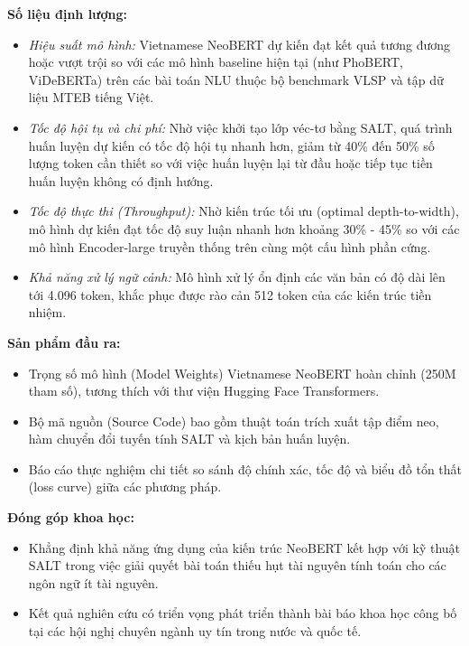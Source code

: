 \documentclass{article}[14pt]
\begin{document}
{    \textbf{Số liệu định lượng:}
    \begin{itemize}
        \item \textit{Hiệu suất mô hình:} Vietnamese NeoBERT dự kiến đạt kết quả tương đương hoặc vượt trội so với các mô hình baseline hiện tại (như PhoBERT, ViDeBERTa) trên các bài toán NLU thuộc bộ benchmark VLSP và tập dữ liệu MTEB tiếng Việt.
        \item \textit{Tốc độ hội tụ và chi phí:} Nhờ việc khởi tạo lớp véc-tơ bằng SALT, quá trình huấn luyện dự kiến có tốc độ hội tụ nhanh hơn, giảm từ 40\% đến 50\% số lượng token cần thiết so với việc huấn luyện lại từ đầu hoặc tiếp tục tiền huấn luyện không có định hướng.
        \item \textit{Tốc độ thực thi (Throughput):} Nhờ kiến trúc tối ưu (optimal depth-to-width), mô hình dự kiến đạt tốc độ suy luận nhanh hơn khoảng 30\% - 45\% so với các mô hình Encoder-large truyền thống trên cùng một cấu hình phần cứng.
        \item \textit{Khả năng xử lý ngữ cảnh:} Mô hình xử lý ổn định các văn bản có độ dài lên tới 4.096 token, khắc phục được rào cản 512 token của các kiến trúc tiền nhiệm.
    \end{itemize}
    
    \textbf{Sản phẩm đầu ra:}
    \begin{itemize}
        \item Trọng số mô hình (Model Weights) Vietnamese NeoBERT hoàn chỉnh (250M tham số), tương thích với thư viện Hugging Face Transformers.
        \item Bộ mã nguồn (Source Code) bao gồm thuật toán trích xuất tập điểm neo, hàm chuyển đổi tuyến tính SALT và kịch bản huấn luyện.
        \item Báo cáo thực nghiệm chi tiết so sánh độ chính xác, tốc độ và biểu đồ tổn thất (loss curve) giữa các phương pháp.
    \end{itemize}
    
    \textbf{Đóng góp khoa học:}
    \begin{itemize}
        \item Khẳng định khả năng ứng dụng của kiến trúc NeoBERT kết hợp với kỹ thuật SALT trong việc giải quyết bài toán thiếu hụt tài nguyên tính toán cho các ngôn ngữ ít tài nguyên.
        \item Kết quả nghiên cứu có triển vọng phát triển thành bài báo khoa học công bố tại các hội nghị chuyên ngành uy tín trong nước và quốc tế.
    \end{itemize}
    
}
\end{document}
